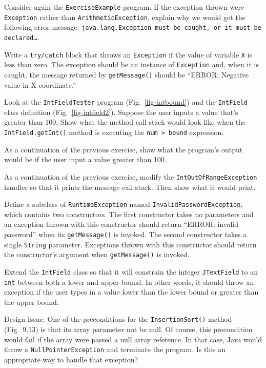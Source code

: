 \begin{EXRtwo}
\item  Consider again the {\tt ExerciseExample} program.
If the exception thrown were {\tt Exception} rather than
{\tt ArithmeticException}, explain why we would get the following error
message: {\tt java.lang.Exception must be caught, or it must be
declared\dots }.

\item  Write a {\tt try/catch} block that throws an
{\tt Exception} if the value of variable {\tt X} is less than zero.
The exception should be an instance of {\tt Exception} and, when
it is caught, the message returned by {\tt getMessage()} should
be ``ERROR: Negative value in X coordinate.''

\item  Look at the {\tt IntFieldTester} program
(Fig.~\ref{fig-intbound}) and the {\tt IntField} class definition
(Fig.~\ref{fig-intfield2}). Suppose the user inputs a value that's
greater than 100. Show what the method call stack would look like
when the {\tt IntField.getInt()} method is executing the
{\tt num > bound} expression.


\item  As a continuation of the previous exercise, show what the
program's output would be if the user input a value greater than
100.

\item  As a continuation of the previous exercise, modify the
{\tt IntOutOfRange\-Exception} handler so that it prints the
message call stack.  Then show what it would print.

\item  Define a subclass of {\tt RuntimeException} named
{\tt In\-valid\-PasswordException}, which contains two constructors.   The
first constructor takes no parameters and an exception thrown with
this constructor should return ``ERROR: invalid password'' when its
{\tt getMessage()} is invoked.  The second constructor takes a single
{\tt String} parameter.  Exceptions thrown with this constructor should
return the constructor's argument when {\tt getMessage()} is
invoked.

\item  Extend the {\tt IntField} class so that it will constrain
the integer {\tt JText\-Field} to an {\tt int} between both a lower and
upper bound.  In other words, it should throw an exception if the user
types in a value lower than the lower bound or greater than the upper
bound.

\item  Design Issue: One of the preconditions for the {\tt Insertion\-Sort()}
method (Fig.~9.13) is that its array parameter not
be null.  Of course, this precondition would fail if the array
were passed a null array reference.   In that case, Java would
throw a {\tt NullPointerException} and terminate the program.
Is this an appropriate way to handle that exception?


\end{EXRtwo}
